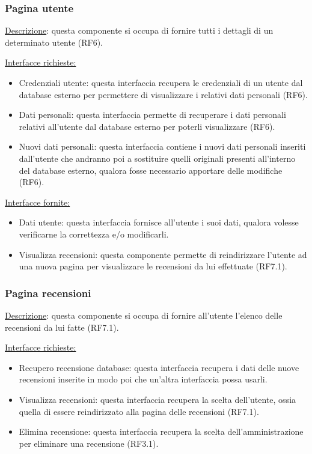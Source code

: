 \documentclass[a4paper,12pt]{article}
\begin{document}
\subsubsection{Pagina utente}
\underline{Descrizione}: questa componente si occupa di fornire tutti i dettagli di un determinato utente (RF6).

\underline{Interfacce richieste:}
\begin{itemize}
\item Credenziali utente: questa interfaccia recupera le credenziali di un utente dal database esterno per permettere di visualizzare i relativi dati personali (RF6).
\item Dati personali: questa interfaccia permette di recuperare i dati personali relativi all'utente dal database esterno per poterli visualizzare (RF6).
\item Nuovi dati personali: questa interfaccia contiene i nuovi dati personali inseriti dall'utente che andranno poi a sostituire quelli originali presenti all'interno del database esterno, qualora fosse necessario apportare delle modifiche (RF6).
\end{itemize}

\underline{Interfacce fornite:}
\begin{itemize}
\item Dati utente: questa interfaccia fornisce all'utente i suoi dati, qualora volesse verificarne la correttezza e/o modificarli.
\item Visualizza recensioni: questa componente permette di reindirizzare l'utente ad una nuova pagina per visualizzare le recensioni da lui effettuate (RF7.1).
\end{itemize}



\subsubsection{Pagina recensioni}
\underline{Descrizione}: questa componente si occupa di fornire all'utente l'elenco delle recensioni da lui fatte (RF7.1).

\underline{Interfacce richieste:}
\begin{itemize}
\item Recupero recensione database: questa interfaccia recupera i dati delle nuove recensioni inserite in modo poi che un'altra interfaccia possa usarli.
\item Visualizza recensioni: questa interfaccia recupera la scelta dell'utente, ossia quella di essere reindirizzato alla pagina delle recensioni (RF7.1). 
\item Elimina recensione: questa interfaccia recupera la scelta dell'amministrazione per eliminare una recensione (RF3.1).
\end{itemize}
\end{document}
